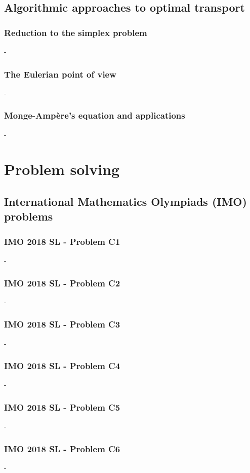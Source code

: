 \documentclass[12pt,openany,oneside]{book}
\theoremstyle{definition}
\numberwithin{definition}{section}
\numberwithin{theorem}{section}
\numberwithin{corollary}{section}
\numberwithin{proposition}{section}
\numberwithin{notation}{section}
\numberwithin{remark}{section}
\numberwithin{hypothesis}{section}
\numberwithin{example}{section}
\begin{document}
\chapter{Algorithmic approaches to optimal transport}

\section{Reduction to the simplex problem}-
\section{The Eulerian point of view}-
\section{Monge-Ampère's equation and applications}-

\part{Problem solving}

\chapter{International Mathematics Olympiads (IMO) problems}

\section{IMO 2018 SL - Problem C1}-
\section{IMO 2018 SL - Problem C2}-
\section{IMO 2018 SL - Problem C3}-
\section{IMO 2018 SL - Problem C4}-
\section{IMO 2018 SL - Problem C5}-
\section{IMO 2018 SL - Problem C6}-
\end{document}
